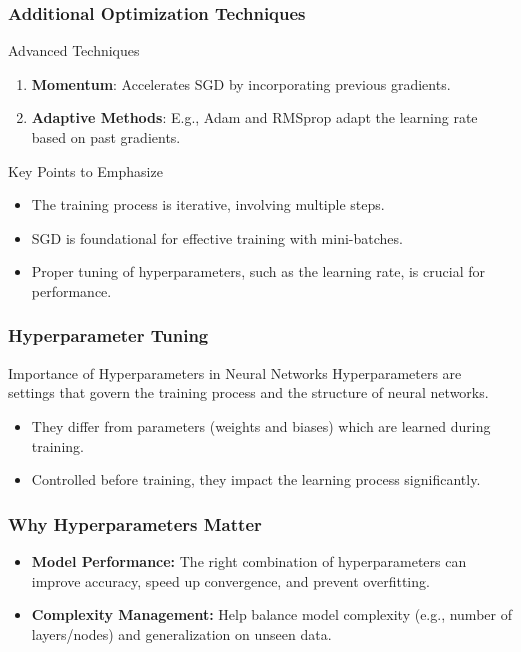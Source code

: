 \documentclass[aspectratio=169]{beamer}
\begin{document}
\begin{frame}[fragile]
    \frametitle{Additional Optimization Techniques}
    \begin{block}{Advanced Techniques}
        \begin{enumerate}
            \item \textbf{Momentum}: Accelerates SGD by incorporating previous gradients.
            \item \textbf{Adaptive Methods}: E.g., Adam and RMSprop adapt the learning rate based on past gradients.
        \end{enumerate}
    \end{block}
    
    \begin{block}{Key Points to Emphasize}
        \begin{itemize}
            \item The training process is iterative, involving multiple steps.
            \item SGD is foundational for effective training with mini-batches.
            \item Proper tuning of hyperparameters, such as the learning rate, is crucial for performance.
        \end{itemize}
    \end{block}
\end{frame}

\begin{frame}
    \frametitle{Hyperparameter Tuning}
    \begin{block}{Importance of Hyperparameters in Neural Networks}
        Hyperparameters are settings that govern the training process and the structure of neural networks. 
        \begin{itemize}
            \item They differ from parameters (weights and biases) which are learned during training.
            \item Controlled before training, they impact the learning process significantly.
        \end{itemize}
    \end{block}
\end{frame}

\begin{frame}
    \frametitle{Why Hyperparameters Matter}
    \begin{itemize}
        \item \textbf{Model Performance:} 
        The right combination of hyperparameters can improve accuracy, speed up convergence, and prevent overfitting.
        
        \item \textbf{Complexity Management:} 
        Help balance model complexity (e.g., number of layers/nodes) and generalization on unseen data.
    \end{itemize}
\end{frame}
\end{document}
